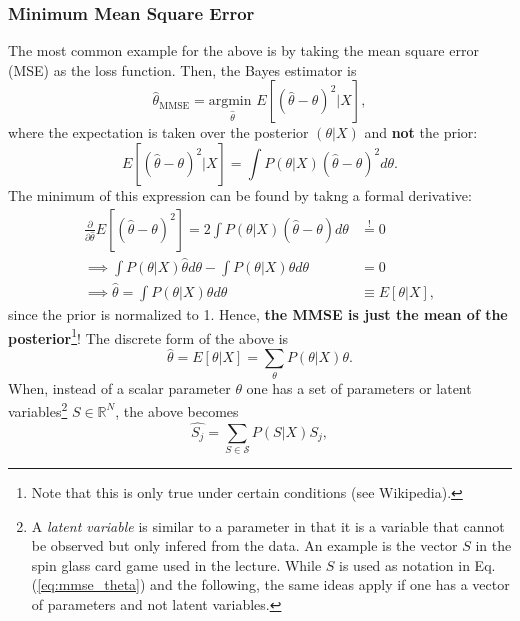 \documentclass{article}
\begin{document}
\subsubsection*{Minimum Mean Square Error}
The most common example for the above is by taking the mean square error (MSE) as the loss function. Then, the Bayes estimator is
\begin{equation}
    \hat{\theta}_{\text{MMSE}} =
    \underset{\hat{\theta}}{\text{argmin }} E\left[(\hat{\theta} - \theta)^2 | X \right],
\end{equation}
where the expectation is taken over the posterior $(\theta | X)$ and \textbf{not} the prior:
\begin{equation}
    E\left[(\hat{\theta} - \theta)^2  | X\right]
    =
    \int P(\theta | X) (\hat{\theta} - \theta)^2 d\theta.
\end{equation}
The minimum of this expression can be found by takng a formal derivative:
\begin{align}
    \frac{\partial}{\partial \hat{\theta}}
    E\left[(\hat{\theta} - \theta)^2 \right]
    = 2\int P(\theta | X) (\hat{\theta} - \theta) d\theta
    &\overset{!}{=} 0 \\
    \implies
    \int  P(\theta | X) \hat{\theta} d\theta
    - \int  P(\theta | X) \theta d\theta &= 0 \\
    \implies
    \hat{\theta} = \int P(\theta | X)\theta d\theta
    &\equiv E\left[ \theta | X\right],
\end{align}
since the prior is normalized to 1. Hence, \textbf{the MMSE is just the mean of the posterior}\footnote{Note that this is only true under certain conditions (see Wikipedia).}! The discrete form of the above is
\begin{equation}
    \hat{\theta} = E\left[ \theta | X\right]
    =
    \sum_{\theta} P(\theta | X)\theta.
\end{equation}
When, instead of a scalar parameter $\theta$ one has a set of parameters or latent variables\footnote{A \emph{latent variable} is similar to a parameter in that it is a variable that cannot be observed but only infered from the data. An example is the vector $S$ in the spin glass card game used in the lecture. While $S$ is used as notation in Eq. (\ref{eq:mmse_theta}) and the following, the same ideas apply if one has a vector of parameters and not latent variables.} $S \in \mathbb{R}^N$, the above becomes
\begin{equation}
    \hat{S_j}
    =
    \sum_{S \in \mathcal{S}} P(S | X)S_j,
    \label{eq:mmse_theta}
\end{equation}
\end{document}
